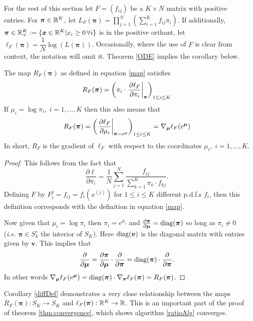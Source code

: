 \label{sect:convergence}
For the rest of this section let $F=(f_{ij})$ be a $K\times N$ matrix with positive entries.  For $\bm\pi\in\mathbb R^K$, let $L_F(\bm\pi)=\prod_{j=1}^{N}\left(\sum_{i=1}^{K}f_{ij}\pi_{i}\right)$. If additionally, $\bm\pi\in\mathbb R_+^K\mathrel{\mathop{:}}=\{\bm x\in\mathbb R^K|x_i\geq 0\,\forall i\}$ is in the positive orthant, 
let $\ell_F(\bm\pi)={\dfrac{1}{N}}\log(L(\bm\pi))$. Occasionally, where the use of \( F \) is clear from context, the notation will omit it. Theorem \ref{ODE} implies the corollary below.

\begin{cor}\label{diffDef}
 The map $R_F(\bm\pi)$ as defined in equation \eqref{map} satisfies
\[R_F(\bm\pi)=\left(\pi_i\cdot\eval{\frac{\partial\ell_F}{\partial\pi_i}}_{\bm\pi}\right)_{1\leq i\leq K}\]
If \( \mu_i = \log \pi_i,\; i=1,\ldots,K\) then this also means that 
\begin{equation}\label{eqn:RGrad}
R_F(\bm\pi) = \left(\eval{\pdv{\ell_F}{\mu_i}}_{\bm\pi = e^{\bm\mu}}\right)_{1\leq i\leq K} = \nabla_{\bm \mu}\elpi[e^{\bm\mu}]{F}
\end{equation}
In short, \( R_F \) is the gradient of \( \ell_F \) with respect to the coordinates \( \mu_i,\; i=1,\ldots,K  \).
\end{cor}
\begin{proof}
This follows from the fact that 
\[\frac{\partial\ell}{\partial\pi_i}=\frac 1N\sum_{j=1}^{N}\frac{f_{ij}}{\sum_{k=1}^{K}\pi_k\cdot f_{kj}}.\]
Defining \( F \) by $ F^j_i = f_{ij}=f_{i}(x^{(j)})$ for $1\leq i\leq K$ different p.d.f.s $f_i$, then this definition corresponds with the definition in equation \eqref{map}.

Now given that \( \mu_i = \log \pi_i \) then \( \pi_i = e^{\mu_i} \) and \( \pdv{\bm\pi}{\bm\mu} = \operatorname{diag}(\bm\pi) \) so long as \( \pi_i \neq 0 \) (\textit{i.e.} \( \bm\pi\in S_k^{\circ} \) the interior of \( S_K \)). Here $\operatorname{diag}(\bm v)$ is the diagonal matrix with entries given by $\bm v$. This implies that 
\[ \pdv{\bm\mu} =  \pdv{\bm\pi}{\bm\mu}\cdot\pdv{\bm\pi} = \operatorname*{diag}(\bm\pi)\cdot\pdv{\bm\pi}. \]
	In other words \( \nabla_{\bm\mu}\ell_F(e^{\bm\mu}) = \operatorname*{diag}(\bm\pi)\cdot\nabla_{\bm\pi}\ell_{F}(\bm\pi) = R_F(\bm\pi)\).
\end{proof}

Corollary \ref{diffDef} demonstrates a very close relationship between the maps $R_F(\bm\pi):S_K\rightarrow S_K$ and $\ell_F(\bm\pi):\mathbb R^K\rightarrow \mathbb R$. This is an important part of the proof of theorem \ref{thm:convergence}, which shows algorithm \ref{ratioAlg} converges.  

